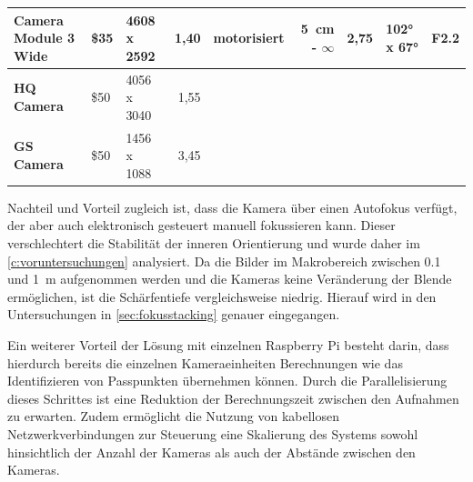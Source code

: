 \documentclass[./00PhotoBox.tex]{subfiles}
\begin{document}
\begin{table}
{\begin{tabular}{l|l|l|r|lr|r|l|r|}
            \multicolumn{1}{|l|}{\textbf{Camera Module 3 Wide}} & \$35                         & \cellcolor[HTML]{9AFF99}4608 x 2592                                  & 1,40                                                              & \multicolumn{1}{l|}{\cellcolor[HTML]{9AFF99}motorisiert}                    & \cellcolor[HTML]{9AFF99}\SI{5}{\centi\metre} - $\infty$                  & 2,75                     & 102° x 67°               & F2.2                         \\ \hline
            \multicolumn{1}{|l|}{\textbf{HQ Camera}}            & \cellcolor[HTML]{FFCCC9}\$50 & 4056 x 3040                                                          & 1,55                                                              & \multicolumn{1}{l|}{\cellcolor[HTML]{FFCCC9}{\color[HTML]{000000} manuell}} & \cellcolor[HTML]{C0C0C0}                                                 & \cellcolor[HTML]{C0C0C0} & \cellcolor[HTML]{C0C0C0} & \cellcolor[HTML]{C0C0C0}     \\ \hline
            \multicolumn{1}{|l|}{\textbf{GS Camera}}            & \cellcolor[HTML]{FFCCC9}\$50 & 1456 x 1088                                                          & \cellcolor[HTML]{9AFF99}3,45                                      & \multicolumn{1}{l|}{\cellcolor[HTML]{FFCCC9}{\color[HTML]{000000} manuell}} & \cellcolor[HTML]{C0C0C0}                                                 & \cellcolor[HTML]{C0C0C0} & \cellcolor[HTML]{C0C0C0} & \cellcolor[HTML]{C0C0C0}     \\ \hline
        \end{tabular}
    }
\end{table}

Nachteil und Vorteil zugleich ist, dass die Kamera über einen Autofokus verfügt, der aber auch elektronisch gesteuert manuell fokussieren kann. Dieser verschlechtert die Stabilität der inneren Orientierung und wurde daher im \autoref{c:voruntersuchungen} analysiert. Da die Bilder im Makrobereich zwischen \SI{0,1}{} und \SI{1}{\metre} aufgenommen werden und die Kameras keine Veränderung der Blende ermöglichen, ist die Schärfentiefe vergleichsweise niedrig. Hierauf wird in den Untersuchungen in \autoref{sec:fokusstacking} genauer eingegangen.

Ein weiterer Vorteil der Lösung mit einzelnen Raspberry Pi besteht darin, dass hierdurch bereits die einzelnen Kameraeinheiten Berechnungen wie das Identifizieren von Passpunkten übernehmen können. Durch die Parallelisierung dieses Schrittes ist eine Reduktion der Berechnungszeit zwischen den Aufnahmen zu erwarten. Zudem ermöglicht die Nutzung von kabellosen Netzwerkverbindungen zur Steuerung eine Skalierung des Systems sowohl hinsichtlich der Anzahl der Kameras als auch der Abstände zwischen den Kameras.
\end{document}
